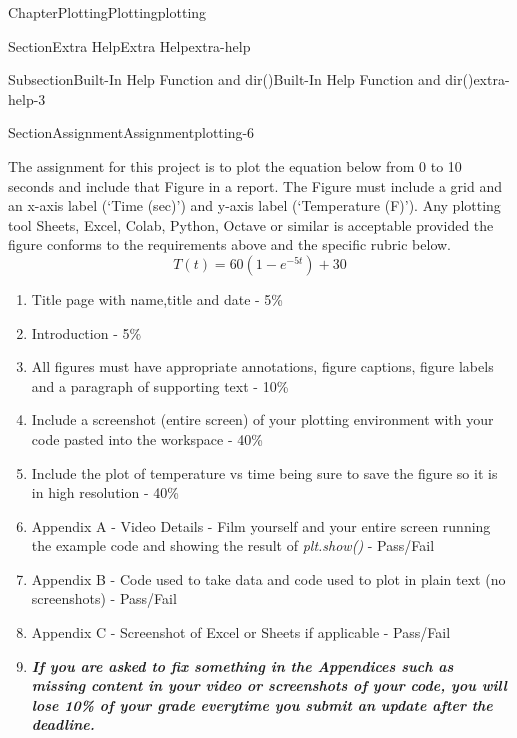 \documentclass[oneside,10pt,]{book}
\newcommand{\alert}[1]{\textbf{\textit{#1}}}
\numberwithin{equation}{section}
\begin{document}
\begin{chapterptx}{Chapter}{Plotting}{}{Plotting}{}{}{plotting}
\begin{sectionptx}{Section}{Extra Help}{}{Extra Help}{}{}{extra-help}
\begin{subsectionptx}{Subsection}{Built-In Help Function and dir()}{}{Built-In Help Function and dir()}{}{}{extra-help-3}
\end{subsectionptx}
\end{sectionptx}
%
%
\typeout{************************************************}
\typeout{************************************************}
%
\begin{sectionptx}{Section}{Assignment}{}{Assignment}{}{}{plotting-6}
\begin{introduction}{}%
The assignment for this project is to plot the equation below from 0 to 10 seconds and include that Figure in a report. The Figure must include a grid and an x-axis label (‘Time (sec)') and y-axis label (‘Temperature (F)'). Any plotting tool Sheets, Excel, Colab, Python, Octave or similar is acceptable provided the figure conforms to the requirements above and the specific rubric below.%
\begin{equation}
T(t) = 60(1-e^{-5t})+30\label{plotting-6-2-1-1}
\end{equation}
%
\begin{enumerate}
\item{}Title page with name,title and date - 5\%%
\item{}Introduction - 5\%%
\item{}All figures must have appropriate annotations, figure captions, figure labels and a paragraph of supporting text - 10\%%
\item{}Include a screenshot (entire screen) of your plotting environment with your code pasted into the workspace - 40\%%
\item{}Include the plot of temperature vs time being sure to save the figure so it is in high resolution - 40\%%
\item{}Appendix A - Video Details - Film yourself and your entire screen running the example code and showing the result of \emph{plt.show()} - Pass\slash{}Fail%
\item{}Appendix B - Code used to take data and code used to plot in plain text (no screenshots) - Pass\slash{}Fail%
\item{}Appendix C - Screenshot of Excel or Sheets if applicable - Pass\slash{}Fail%
\item{}\alert{If you are asked to fix something in the Appendices such as missing content in your video or screenshots of your code, you will lose 10\% of your grade everytime you submit an update after the deadline.}%
\end{enumerate}
%
\end{introduction}%
\end{sectionptx}
\end{chapterptx}
\end{document}
